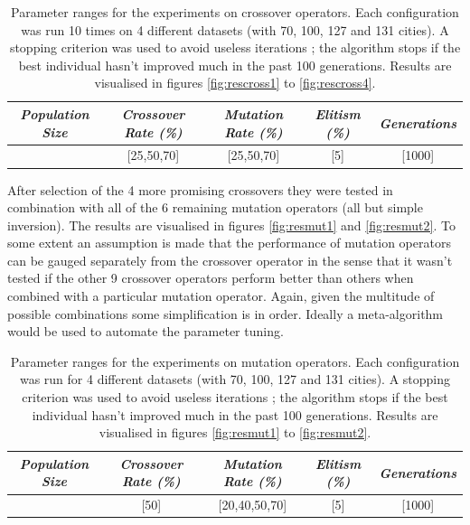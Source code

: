 \begin{table}[h]
\centering
\begin{tabular}{c|c|c|c|c}
\textit{Population Size} & \textit{Crossover Rate (\%)} & \textit{Mutation Rate (\%)} & \textit{Elitism (\%)} & \textit{Generations} \\\hline 
[300] & [25,50,70] & [25,50,70] & [5] & [1000]
\end{tabular}
\caption{Parameter ranges for the experiments on crossover operators. Each configuration was run 10 times on 4 different datasets (with 70, 100, 127 and 131 cities). A stopping criterion was used to avoid useless iterations ; the algorithm stops if the best individual hasn't improved much in the past 100 generations. Results are visualised in figures \ref{fig:rescross1} to \ref{fig:rescross4}.}
\label{tab:par2}
\end{table}

\par\noindent After selection of the 4 more promising crossovers they were tested in combination with all of the 6 remaining mutation operators (all but simple inversion). The results are visualised in figures \ref{fig:resmut1} and \ref{fig:resmut2}. To some extent an assumption is made that the performance of mutation operators can be gauged separately from the crossover operator in the sense that it wasn't tested if the other 9 crossover operators perform better than others when combined with a particular mutation operator. Again, given the multitude of possible combinations some simplification is in order. Ideally a meta-algorithm would be used to automate the parameter tuning.

\begin{table}[H]
\centering
\begin{tabular}{c|c|c|c|c}
\textit{Population Size} & \textit{Crossover Rate (\%)} & \textit{Mutation Rate (\%)} & \textit{Elitism (\%)} & \textit{Generations} \\\hline 
[300] & [50] & [20,40,50,70] & [5] & [1000]
\end{tabular}
\caption{Parameter ranges for the experiments on mutation operators. Each configuration was run for 4 different datasets (with 70, 100, 127 and 131 cities). A stopping criterion was used to avoid useless iterations ; the algorithm stops if the best individual hasn't improved much in the past 100 generations. Results are visualised in figures \ref{fig:resmut1} to \ref{fig:resmut2}.}
\label{tab:par3}
\end{table}

